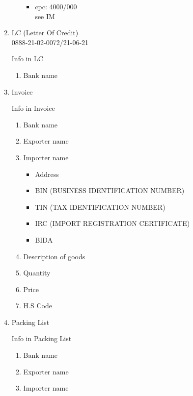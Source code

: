 \documentclass[10pt]{article}
\begin{document}
\begin{enumerate}
\begin{itemize}
\begin{itemize}
        \item cpc: 4000/000
            \\ see IM
\end{itemize}
\end{itemize}
        \item LC (Letter Of Credit)
            \\
            0888-21-02-0072/21-06-21
\begin{description}
    \item [Info in LC]
\end{description}
\begin{enumerate}
    \item Bank name
\end{enumerate}
    \item Invoice
\begin{description}
    \item [Info in Invoice]
\end{description}
\begin{enumerate}
    \item Bank name
    \item Exporter name 
    \item Importer name 
\begin{itemize}
        \item Address
        \item BIN (BUSINESS IDENTIFICATION NUMBER)
        \item TIN (TAX IDENTIFICATION NUMBER)
        \item IRC (IMPORT REGISTRATION CERTIFICATE)
        \item BIDA
\end{itemize}
        \item Description of goods
        \item Quantity
        \item Price
        \item H.S Code
\end{enumerate}
    \item Packing List
\begin{description}
    \item [Info in Packing List]
\end{description}
\begin{enumerate}
    \item Bank name
    \item Exporter name 
    \item Importer name 
\begin{itemize}

\end{itemize}
\end{enumerate}
\end{enumerate}
\end{document}
